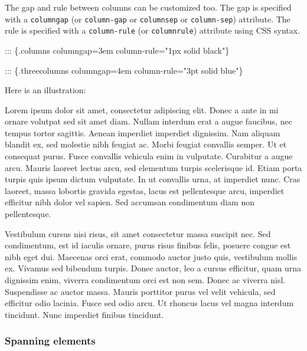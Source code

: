 \documentclass[
]{article}
\newenvironment{Shaded}{}{}
\newcommand{\NormalTok}[1]{#1}
\begin{document}
The gap and rule between columns can be customized too. The gap is
specified with a \texttt{columngap} (or \texttt{column-gap} or
\texttt{columnsep} or \texttt{column-sep}) attribute. The rule is
specified with a \texttt{column-rule} (or \texttt{columnrule}) attribute
using CSS syntax.

\begin{Shaded}
\begin{Highlighting}[]
\NormalTok{::: \{.columns columngap=3em column{-}rule="1px solid black"\}}

\NormalTok{::: \{.threecolumns columngap=4em column{-}rule="3pt solid blue"\}}
\end{Highlighting}
\end{Shaded}

Here is an illustration:

{\raggedcolumns\setlength{\columnsep}{4em}
\setlength{\columnseprule}{ 3pt}
\renewcommand{\columnseprulecolor}{\color{blue}}
\begin{multicols}{3}

Lorem ipsum dolor sit amet, consectetur adipiscing elit. Donec a ante in
mi ornare volutpat sed sit amet diam. Nullam interdum erat a augue
faucibus, nec tempus tortor sagittis. Aenean imperdiet imperdiet
dignissim. Nam aliquam blandit ex, sed molestie nibh feugiat ac. Morbi
feugiat convallis semper. Ut et consequat purus. Fusce convallis
vehicula enim in vulputate. Curabitur a augue arcu. Mauris laoreet
lectus arcu, sed elementum turpis scelerisque id. Etiam porta turpis
quis ipsum dictum vulputate. In ut convallis urna, at imperdiet nunc.
Cras laoreet, massa lobortis gravida egestas, lacus est pellentesque
arcu, imperdiet efficitur nibh dolor vel sapien. Sed accumsan
condimentum diam non pellentesque.

Vestibulum cursus nisi risus, sit amet consectetur massa suscipit nec.
Sed condimentum, est id iaculis ornare, purus risus finibus felis,
posuere congue est nibh eget dui. Maecenas orci erat, commodo auctor
justo quis, vestibulum mollis ex. Vivamus sed bibendum turpis. Donec
auctor, leo a cursus efficitur, quam urna dignissim enim, viverra
condimentum orci est non sem. Donec ac viverra nisl. Suspendisse ac
auctor massa. Mauris porttitor purus vel velit vehicula, sed efficitur
odio lacinia. Fusce sed odio arcu. Ut rhoncus lacus vel magna interdum
tincidunt. Nunc imperdiet finibus tincidunt.

\end{multicols}
}

\hypertarget{spanning-elements}{%
\subsubsection{Spanning elements}\label{spanning-elements}}
\end{document}
